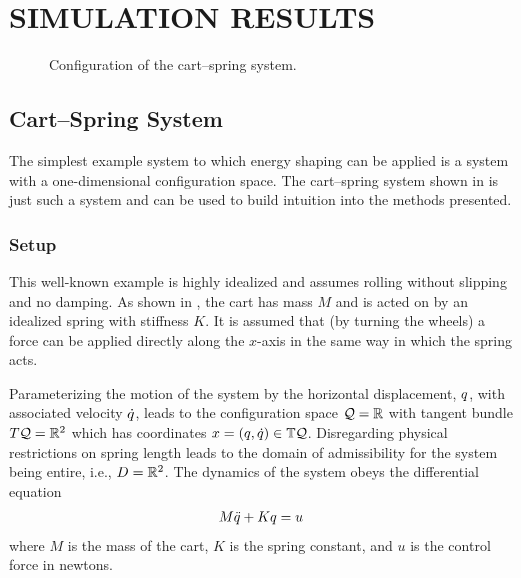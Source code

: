 \chapter{\uppercase{Simulation Results}}



\begin{figure}[t!]
  \centering
  \def\svgwidth{0.7\columnwidth}
  
  \caption[Configuration of the cart--spring system.]{Configuration of the
    cart--spring system.}
  \label{fig:cart-spring-configuration}
\end{figure}

\section{Cart--Spring System}

The simplest example system to which energy shaping can be applied is a system
with a one-dimensional configuration space.
%
The cart--spring system shown in  is just
such a system and can be used to build intuition into the methods presented.

\subsection{Setup}

This well-known example is highly idealized and assumes rolling without slipping
and no damping.
%
As shown in , the cart has mass $M$ and is
acted on by an idealized spring with stiffness $K$.
%
It is assumed that (by turning the wheels) a force can be applied directly along
the $x$-axis in the same way in which the spring acts.

%
Parameterizing the motion of the system by the horizontal displacement, $q$, with
associated velocity $\dot{q}$, leads to the configuration space $\mathcal{Q} = \mathbb{R}$ with
tangent bundle $T\mathcal{Q} = \mathbb{R}^{2}$ which has coordinates $x = (q, \dot{q}) \in \mathbb{T}\mathcal{Q}$.
%
Disregarding physical restrictions on spring length leads to the domain of
admissibility for the system being entire, i.e., $D = \mathbb{R}^{2}$.
%
The dynamics of the system obeys the differential equation
\begin{align*}
  M \ddot{q} + K q = u
\end{align*}
where $M$ is the mass of the cart, $K$ is the spring constant, and $u$ is the
control force in newtons.

